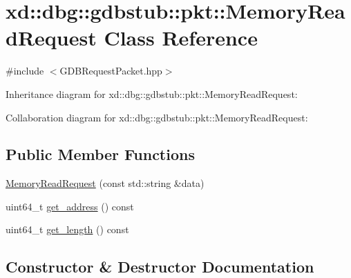 \hypertarget{classxd_1_1dbg_1_1gdbstub_1_1pkt_1_1_memory_read_request}{}\section{xd\+:\+:dbg\+:\+:gdbstub\+:\+:pkt\+:\+:Memory\+Read\+Request Class Reference}
\label{classxd_1_1dbg_1_1gdbstub_1_1pkt_1_1_memory_read_request}


{\ttfamily \#include $<$G\+D\+B\+Request\+Packet.\+hpp$>$}



Inheritance diagram for xd\+:\+:dbg\+:\+:gdbstub\+:\+:pkt\+:\+:Memory\+Read\+Request\+:


Collaboration diagram for xd\+:\+:dbg\+:\+:gdbstub\+:\+:pkt\+:\+:Memory\+Read\+Request\+:
\subsection*{Public Member Functions}
\begin{DoxyCompactItemize}
\item 
\mbox{\hyperlink{classxd_1_1dbg_1_1gdbstub_1_1pkt_1_1_memory_read_request_a1ede04a724fc2792678669d968f81a60}{Memory\+Read\+Request}} (const std\+::string \&data)
\item 
uint64\+\_\+t \mbox{\hyperlink{classxd_1_1dbg_1_1gdbstub_1_1pkt_1_1_memory_read_request_a87c67d1b89016cc02a8ea925ac191995}{get\+\_\+address}} () const
\item 
uint64\+\_\+t \mbox{\hyperlink{classxd_1_1dbg_1_1gdbstub_1_1pkt_1_1_memory_read_request_aaf1f2b7c78014f97ffe900415742aa4c}{get\+\_\+length}} () const
\end{DoxyCompactItemize}


\subsection{Constructor \& Destructor Documentation}
\mbox{\label{classxd_1_1dbg_1_1gdbstub_1_1pkt_1_1_memory_read_request_a1ede04a724fc2792678669d968f81a60}} 
